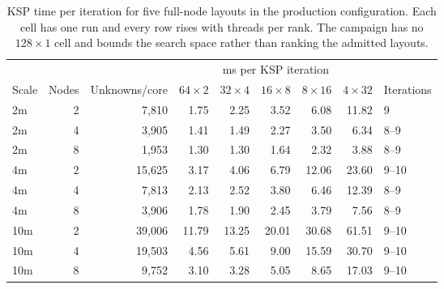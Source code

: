\documentclass[11pt,a4paper,oneside]{report}
\begin{document}
\begin{table}[htbp]
  \centering
  \caption{KSP time per iteration for five full-node layouts in the production
  configuration. Each cell has one run and every row rises with threads per rank. The
  campaign has no $128\times1$ cell and bounds the search space rather than ranking the
  admitted layouts.}
  \label{tab:thread-limit}
  \begin{tabular}{lrrrrrrrl}
    \toprule
    & & & \multicolumn{5}{c}{ms per KSP iteration} & \\
    \cmidrule(lr){4-8}
    Scale & Nodes & Unknowns/core & $64\times2$ & $32\times4$ & $16\times8$ & $8\times16$ & $4\times32$ & Iterations \\
    \midrule
    2m  & 2 &  7,810 &  1.75 &  2.25 &  3.52 &  6.08 & 11.82 & 9 \\
    2m  & 4 &  3,905 &  1.41 &  1.49 &  2.27 &  3.50 &  6.34 & 8--9 \\
    2m  & 8 &  1,953 &  1.30 &  1.30 &  1.64 &  2.32 &  3.88 & 8--9 \\
    \addlinespace
    4m  & 2 & 15,625 &  3.17 &  4.06 &  6.79 & 12.06 & 23.60 & 9--10 \\
    4m  & 4 &  7,813 &  2.13 &  2.52 &  3.80 &  6.46 & 12.39 & 8--9 \\
    4m  & 8 &  3,906 &  1.78 &  1.90 &  2.45 &  3.79 &  7.56 & 8--9 \\
    \addlinespace
    10m & 2 & 39,006 & 11.79 & 13.25 & 20.01 & 30.68 & 61.51 & 9--10 \\
    10m & 4 & 19,503 &  4.56 &  5.61 &  9.00 & 15.59 & 30.70 & 9--10 \\
    10m & 8 &  9,752 &  3.10 &  3.28 &  5.05 &  8.65 & 17.03 & 9--10 \\
    \bottomrule
  \end{tabular}
\end{table}
\end{document}
